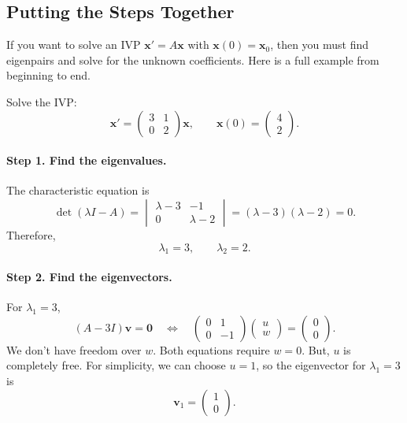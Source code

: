 \documentclass[10pt,letterpaper]{article}
\begin{document}
\subsection{Putting the Steps Together}
If you want to solve an IVP $\textbf{x}'=A\textbf{x}$ with $\textbf{x}(0)=\textbf{x}_0$, then you must find eigenpairs and solve for the unknown coefficients. Here is a full example from beginning to end.

\begin{example}[6]{
Solve the IVP:
\[
\mathbf{x}'=
\begin{pmatrix}
3&1\\
0&2
\end{pmatrix}\mathbf{x},
\qquad
\mathbf{x}(0)=\begin{pmatrix}4\\2\end{pmatrix}.
\]
}

\paragraph{Step 1. Find the eigenvalues.}
The characteristic equation is
\[
\det(\lambda I-A)
=
\begin{vmatrix}
\lambda-3&-1\\
0&\lambda-2
\end{vmatrix}
=(\lambda-3)(\lambda-2)=0.
\]
Therefore,
\[
\lambda_1=3,\qquad \lambda_2=2.
\]

\paragraph{Step 2. Find the eigenvectors.}
For $\lambda_1=3$,
\[
(A-3I)\mathbf{v}=\mathbf{0}
\quad\Longleftrightarrow\quad
\begin{pmatrix}
0&1\\
0&-1
\end{pmatrix}
\begin{pmatrix}u\\w\end{pmatrix}
=\begin{pmatrix}0\\0\end{pmatrix}.
\]
We don't have freedom over $w$. Both equations require $w=0$. But, $u$ is completely free. For simplicity, we can choose $u=1$, so the eigenvector for $\lambda_1=3$ is
\[
\mathbf{v}_1=\begin{pmatrix}1\\0\end{pmatrix}.
\]


\end{example}
\end{document}
